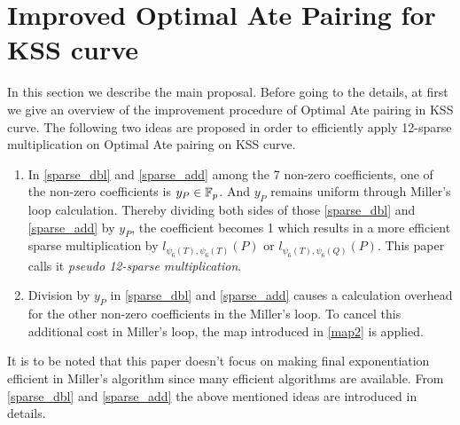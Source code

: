 \section{Improved Optimal Ate Pairing for KSS curve}
In this section we describe the main proposal. Before going to the details, at first we give an overview of the improvement procedure of Optimal Ate pairing in KSS curve. The following two ideas are proposed in order to efficiently apply 12-sparse multiplication on Optimal Ate pairing on KSS curve. 
\begin{enumerate}
	\item In \eqref{sparse_dbl} and \eqref{sparse_add} among the 7 non-zero coefficients, one of the non-zero coefficients is $y_P \in {\mathbb{F}}_{p}$. And $y_P$ remains uniform through Miller's loop calculation. Thereby dividing both sides of those \eqref{sparse_dbl} and \eqref{sparse_add} by $y_P$, the coefficient becomes 1 which results in a more efficient sparse multiplication by $l_{\psi_6(T),\psi_6(T)}(P)$ or $l_{\psi_6(T),\psi_6(Q)}(P)$. This paper calls it \textit{pseudo 12-sparse multiplication}.
	\item Division by $y_P$ in \eqref{sparse_dbl} and \eqref{sparse_add} causes a calculation overhead for the other non-zero coefficients in the Miller's loop. To cancel this  additional cost in Miller's loop, the map introduced in \eqref{map2} is applied.
\end{enumerate}
It is to be noted that this paper doesn't focus on making final exponentiation efficient in Miller's algorithm since many efficient algorithms are available.
From \eqref{sparse_dbl} and \eqref{sparse_add} the above mentioned ideas are introduced in details.
